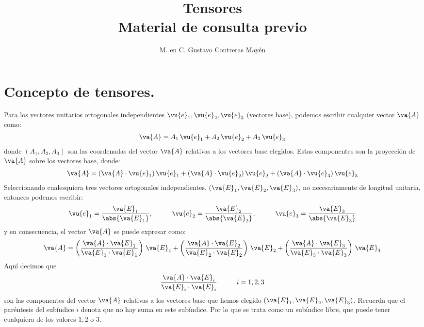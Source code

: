 
\usetikzlibrary{babel}
\setlength{\tabcolsep}{12pt}
\title{Tensores \\ \large{Material de consulta previo}\vspace{-3ex}}
\author{M. en C. Gustavo Contreras Mayén}
\date{ }

\vspace{-4cm}
\maketitle
\fontsize{14}{14}\selectfont
\tableofcontents
\newpage


\section{Concepto de tensores.}

Para los vectores unitarios ortogonales independientes $\vu{e}_{1}, \vu{e}_2, \vu{e}_{3}$ (vectores base), podemos escribir cualquier vector $\va{A}$ como:
\begin{align*}
\va{A} = A_{1} \, \vu{e}_{1} + A_{2} \, \vu{e}_{2} + A_{3} \, \vu{e}_{3}
\end{align*}
donde $(A_{1}, A_{2}, A_{3})$ son las coordenadas del vector $\va{A}$ relativas a los vectores base elegidos. Estas componentes son la proyección de $\va{A}$ sobre los vectores base, donde:
\begin{align*}
\va{A} = (\va{A} \cdot \vu{e}_{1}) \, \vu{e}_{1} + (\va{A} \cdot \vu{e}_{2}) \, \vu{e}_{2} + (\va{A} \cdot \vu{e}_{3}) \, \vu{e}_{3}
\end{align*}
Seleccionando cualesquiera tres vectores ortogonales independientes, \hfill \break $(\va{E}_{1}, \va{E}_{2}, \va{E}_{3})$, no necesariamente de longitud unitaria, entonces podemos escribir:
\begin{align*}
\vu{e}_{1} = \dfrac{\va{E}_{1}}{\abs{\va{E}_{1}}}, \hspace{1cm} \vu{e}_{2} = \dfrac{\va{E}_{2}}{\abs{\va{E}_{2}}}, \hspace{1cm} \vu{e}_{3} = \dfrac{\va{E}_{3}}{\abs{\va{E}_{3}}}
\end{align*}
y en consecuencia, el vector $\va{A}$ se puede expresar como:
\begin{align*}
\va{A} = \left( \dfrac{\va{A} \cdot \va{E}_{1}}{\va{E}_{1} \cdot \va{E}_{1}} \right) \, \va{E}_{1} + \left( \dfrac{\va{A} \cdot \va{E}_{2}}{\va{E}_{2} \cdot \va{E}_{2}} \right) \, \va{E}_{2} + \left( \dfrac{\va{A} \cdot \va{E}_{3}}{\va{E}_{3} \cdot \va{E}_{3}} \right) \, \va{E}_{3} 
\end{align*}
Aquí decimos que
\begin{align*}
\dfrac{\va{A} \cdot \va{E}_{i}}{\va{E}_{i} \cdot \va{E}_{i}} \hspace{1cm} i = 1, 2, 3
\end{align*}
son las componentes del vector $\va{A}$ relativas a los vectores base que hemos elegido $(\va{E}_{1}, \va{E}_{2}, \va{E}_{3})$. Recuerda que el paréntesis del subíndice $i$ denota que no hay suma en este subíndice. Por lo que se trata como un subíndice libre, que puede tener cualquiera de los valores $1, 2$ o $3$.

